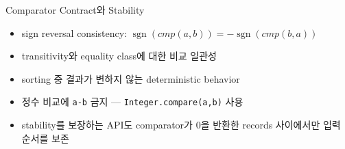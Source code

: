 \begin{frame}{Comparator Contract와 Stability}
\begin{itemize}\item sign reversal consistency: $\operatorname{sgn}(cmp(a,b))=-\operatorname{sgn}(cmp(b,a))$\item transitivity와 equality class에 대한 비교 일관성\item sorting 중 결과가 변하지 않는 deterministic behavior\item 정수 비교에 \texttt{a-b} 금지 — \texttt{Integer.compare(a,b)} 사용\item stability를 보장하는 API도 comparator가 0을 반환한 records 사이에서만 입력 순서를 보존\end{itemize}
\end{frame}
